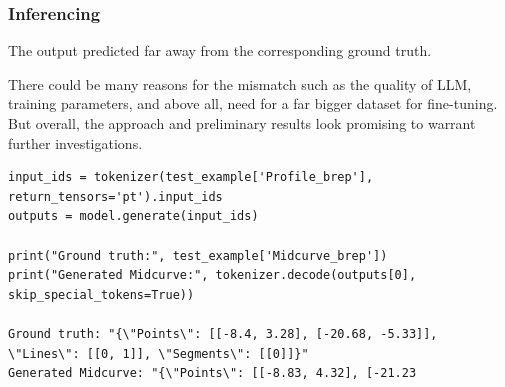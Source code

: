 \begin{frame}[fragile]\frametitle{Inferencing}

The output predicted far away from the corresponding ground truth. 

There could be many reasons for the mismatch such as the quality of LLM, training parameters, and above all, need for a far bigger dataset for fine-tuning. But overall, the approach and preliminary results look promising to warrant further investigations.

\begin{lstlisting}[basicstyle=\tiny, breaklines=true, breakatwhitespace=true,label=lst:python]
input_ids = tokenizer(test_example['Profile_brep'], return_tensors='pt').input_ids
outputs = model.generate(input_ids)

print("Ground truth:", test_example['Midcurve_brep'])
print("Generated Midcurve:", tokenizer.decode(outputs[0], skip_special_tokens=True))

Ground truth: "{\"Points\": [[-8.4, 3.28], [-20.68, -5.33]], \"Lines\": [[0, 1]], \"Segments\": [[0]]}"
Generated Midcurve: "{\"Points\": [[-8.83, 4.32], [-21.23
\end{lstlisting}

\end{frame}